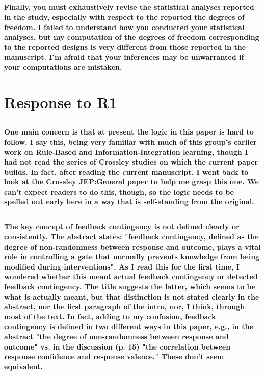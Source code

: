 \documentclass[10pt,a4paper]{article} \usepackage{amsmath} \usepackage{parskip}
\begin{document}
\subsection{} \textbf{Finally, you must exhaustively revise the statistical
analyses reported in the study, especially with respect to the reported the
degrees of freedom. I failed to understand how you conducted your statistical
analyses, but my computation of the degrees of freedom corresponding to the
reported designs is very different from those reported in the manuscript. I'm
afraid that your inferences may be unwarranted if your computations are
mistaken.}

\section{Response to R1}
\subsection{} \textbf{}

\subsection{} \textbf{
  One main concern is that at present the logic in this paper is hard to follow.
  I say this, being very familiar with much of this group's earlier work on
  Rule-Based and Information-Integration learning, though I had not read the
  series of Crossley studies on which the current paper builds. In fact, after
  reading the current manuscript, I went back to look at the Crossley JEP:General
  paper to help me grasp this one. We can't expect readers to do this, though, so
  the logic needs to be spelled out early here in a way that is self-standing from
  the original.
}

\subsection{} \textbf{
  The key concept of feedback contingency is not defined clearly or consistently.
  The abstract states: "feedback contingency, defined as the degree of
  non-randomness between response and outcome, plays a vital role in controlling a
  gate that normally prevents knowledge from being modified during interventions".
  As I read this for the first time, I wondered whether this meant actual feedback
  contingency or detected feedback contingency. The title suggests the latter,
  which seems to be what is actually meant, but that distinction is not stated
  clearly in the abstract, nor the first paragraph of the intro, nor, I think,
  through most of the text. In fact, adding to my confusion, feedback contingency
  is defined in two different ways in this paper, e.g., in the abstract "the
  degree of non-randomness between response and outcome" vs. in the discussion (p.
  15) "the correlation between response confidence and response valence." These
  don't seem equivalent.
}
\end{document}
